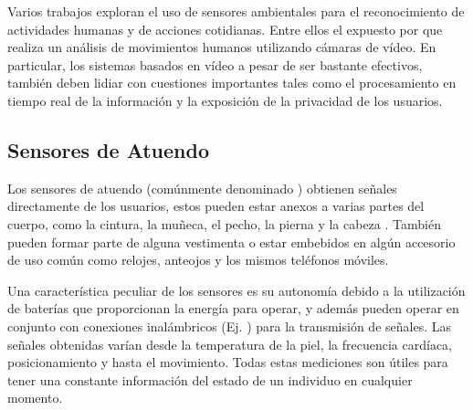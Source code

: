 Varios trabajos exploran el uso de sensores ambientales para el reconocimiento
de actividades humanas y de acciones cotidianas. Entre ellos el expuesto
por \cite{Poppe2007} que realiza un análisis de movimientos humanos
utilizando cámaras de vídeo. En particular, los sistemas basados en
vídeo a pesar de ser bastante efectivos, también deben lidiar con
cuestiones importantes tales como el procesamiento en tiempo real
de la información y la exposición de la privacidad de los usuarios.

\subsection{Sensores de Atuendo}

Los sensores de atuendo (comúnmente denominado\emph{ })
obtienen señales directamente de los usuarios, estos pueden estar
anexos a varias partes del cuerpo, como la cintura, la muñeca, el
pecho, la pierna y la cabeza \cite{Bao2004}. También pueden formar
parte de alguna vestimenta o estar embebidos en algún accesorio de
uso común como relojes, anteojos y los mismos teléfonos móviles. 

Una característica peculiar de los sensores es su autonomía debido
a la utilización de baterías que proporcionan la energía para operar,
y además pueden operar en conjunto con conexiones inalámbricos (Ej.
\emph{}) para la transmisión de señales. Las señales
obtenidas varían desde la temperatura de la piel, la frecuencia cardíaca,
posicionamiento y hasta el movimiento. Todas estas mediciones son
útiles para tener una constante información del estado de un individuo
en cualquier momento.

